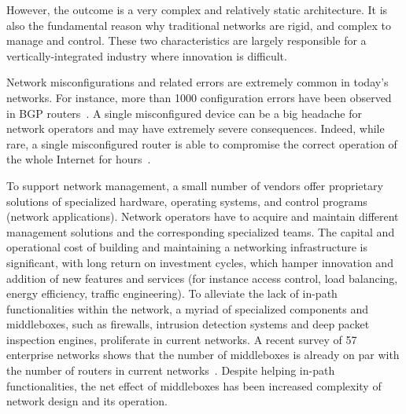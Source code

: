 However, the outcome is a very complex and relatively static architecture. It is also the 
fundamental reason why traditional networks are rigid, and complex to manage and control.
These two characteristics are largely responsible for a vertically-integrated industry where 
innovation is difficult.

Network misconfigurations and related errors are extremely common in today's networks. 
For instance, more than 1000 configuration errors have been observed in BGP 
routers~\cite{feamster2005}. A single misconfigured device can be a big 
headache for network operators and may have extremely severe consequences. Indeed, while
rare, a single misconfigured router is able to compromise the correct operation of the 
whole Internet for hours~\cite{barrett1997,butler2010}. 

To support network management, a small number of vendors offer proprietary solutions of 
specialized hardware, operating systems, and control programs (network applications). 
Network operators have to acquire and maintain different management solutions and the 
corresponding specialized teams.  The capital and operational cost of building and 
maintaining a networking infrastructure is significant, with long return on investment 
cycles, which hamper innovation and addition of new features and services (for instance 
access control, load balancing, energy efficiency, traffic engineering).  
To alleviate the lack of in-path functionalities within the network, a myriad of specialized 
components and middleboxes, such as firewalls, intrusion detection systems and deep packet inspection engines, proliferate 
in current networks. A recent survey of 57 enterprise networks shows that the number of 
middleboxes is already on par with the number of routers in current networks~\cite{sherry2012}.
Despite helping in-path functionalities, the net effect of middleboxes has been increased
complexity of network design and its operation.


